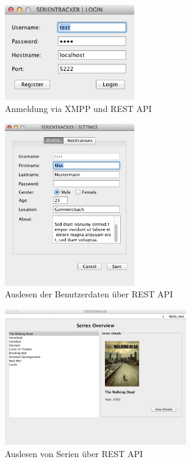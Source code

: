 \begin{figure}[H]
  \centering
\includegraphics[width=0.5\textwidth]{../images/screenshots/client-login.png}
\caption{Anmeldung via XMPP und REST API}
\label{login}
\end{figure}

\begin{figure}[H]
  \centering
\includegraphics[width=0.5\textwidth]{../images/screenshots/client-user-settings.png}
\caption{Auslesen der Benutzerdaten über REST API}
\label{settings}
\end{figure}

 \begin{figure}[H]
   \centering
\includegraphics[width=0.7\textwidth]{../images/screenshots/client-series-overview.png}
\caption{Auslesen von Serien über REST API}
\label{overview}
\end{figure}

